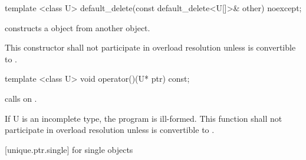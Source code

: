 \begin{itemdecl}
template <class U> default_delete(const default_delete<U[]>& other) noexcept;
\end{itemdecl}

\begin{itemdescr}
\pnum
\effects
constructs a  object from another  object.

\pnum
\notes
This constructor shall not participate in overload resolution unless  is
convertible to .
\end{itemdescr}

\begin{itemdecl}
template <class U> void operator()(U* ptr) const;
\end{itemdecl}

\begin{itemdescr}
\pnum
\effects
calls  on .

\pnum
\notes If U is an incomplete type, the program is ill-formed.
This function shall not participate in overload resolution
unless  is convertible to .
\end{itemdescr}

[unique.ptr.single]{ for single objects}

